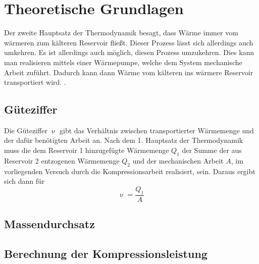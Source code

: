 \section{Theoretische Grundlagen}
\label{sec:Theorie}

Der zweite Hauptsatz der Thermodynamik besagt, dass Wärme immer vom wärmeren zum kälteren Reservoir fließt. Dieser Prozess lässt sich allerdings auch umkehren.
Es ist allerdings auch möglich, diesen Prozess umzukehren. Dies kann man realisieren mittels einer Wärmepumpe, welche dem System mechanische Arbeit zuführt. Dadurch kann dann
Wärme vom kälteren ins wärmere Reservoir transportiert wird.
.

\subsection {Güteziffer}
\label{sec:güteziffer}
Die Güteziffer $\upnu$ gibt das Verhältnis zwischen transportierter Wärmemenge und der dafür benötigten Arbeit an. Nach dem 1. Hauptsatz der Thermodynamik muss die dem Reservoir 1 hinzugefügte Wärmemenge $Q_1$
der Summe der aus Reservoir 2 entzogenen Wärmemenge $Q_2$ und der mechanischen Arbeit $A$, im vorliegenden Versuch durch die Kompressionsarbeit realisiert, sein.
Daraus ergibt sich dann für
\begin{equation}
  \upnu=\frac{Q_1}{A}
\end{equation}

\subsection {Massendurchsatz}
\label{sec:massendurchsatz}
\subsection {Berechnung der Kompressionsleistung}
\label{sec:kompressorleistung}








\cite{Anleitung}

